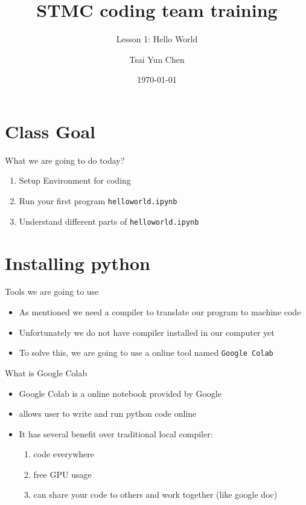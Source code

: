 \documentclass[10pt,xcolor={table,dvipsnames},t]{beamer}
\title[Your Short Title]{STMC coding team training}
\subtitle{Lesson 1: Hello World}
\author{Tsai Yun Chen}
\date{\today}
\begin{document}
\begin{frame}
  \titlepage
\end{frame}


\section{Class Goal}

\begin{frame}{What we are going to do today?}

\begin{enumerate}
  \item Setup Environment for coding
  \item Run your first program \texttt{helloworld.ipynb}
  \item Understand different parts of \texttt{helloworld.ipynb}
\end{enumerate}

\end{frame}

\section{Installing python}

\begin{frame}{Tools we are going to use}
  \begin{itemize}
    \item As mentioned we need a compiler to translate our program to machine code
    \item Unfortunately we do not have compiler installed in our computer yet
    \item To solve this, we are going to use a online tool named \texttt{Google Colab}
  \end{itemize}
\end{frame}

\begin{frame}{What is Google Colab}
  \begin{itemize}
    \item Google Colab is a online notebook provided by Google
    \item allows user to write and run python code online
    \item It has several benefit over traditional local compiler:
    \begin{enumerate}
      \item code everywhere
      \item free GPU usage
      \item can share your code to others and work together (like google doc)
    \end{enumerate}
  \end{itemize}
\end{frame}
\end{document}
